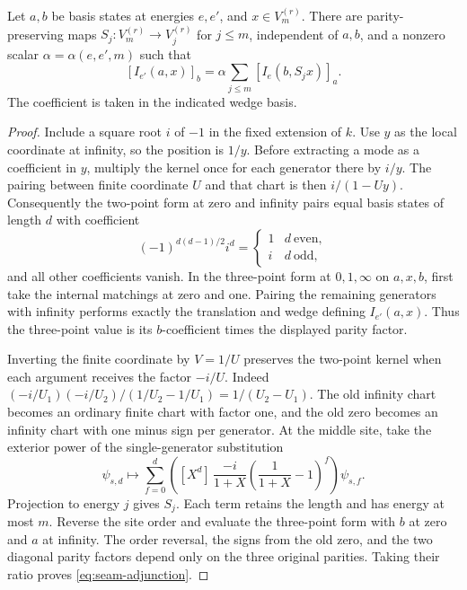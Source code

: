\begin{lemma}\label{lem:seam}
Let \(a,b\) be basis states at energies \(e,e'\), and
\(x\in V_m^{(r)}\). There are parity-preserving maps
\(S_j:V_m^{(r)}\to V_j^{(r)}\) for \(j\le m\), independent of \(a,b\),
and a nonzero scalar \(\alpha=\alpha(e,e',m)\) such that
\begin{equation}\label{eq:seam-adjunction}
 [I_{e'}(a,x)]_b
    =\alpha\sum_{j\le m}[I_e(b,S_jx)]_a .
\end{equation}
The coefficient is taken in the indicated wedge basis.
\end{lemma}
\begin{proof}
Include a square root \(i\) of \(-1\) in the fixed extension of \(k\).
Use \(y\) as the local coordinate at infinity, so the position is \(1/y\).
Before extracting a mode as a coefficient in \(y\), multiply the kernel
once for each generator there by
\(i/y\). The pairing between finite coordinate \(U\) and that chart is
then \(i/(1-Uy)\). Consequently the two-point form at zero and infinity
pairs equal basis states of length \(d\) with coefficient
\[
      (-1)^{d(d-1)/2}i^d=
      \begin{cases}1& d\ \text{even},\\ i& d\ \text{odd},\end{cases}
\]
and all other coefficients vanish. In the three-point form
at \(0,1,\infty\) on \(a,x,b\), first take the internal matchings at
zero and one. Pairing the remaining generators with infinity performs
exactly the translation and wedge defining \(I_{e'}(a,x)\). Thus the
three-point value is its \(b\)-coefficient times the displayed parity
factor.

Inverting the finite coordinate by \(V=1/U\) preserves the two-point
kernel when each argument receives the factor \(-i/U\). Indeed
\((-i/U_1)(-i/U_2)/(1/U_2-1/U_1)=1/(U_2-U_1)\).
The old infinity chart becomes an ordinary finite chart with factor one,
and the old zero becomes an infinity chart with one minus sign per
generator. At the middle site, take the exterior power of the
single-generator substitution
\[
 \psi_{s,d}\longmapsto
 \sum_{f=0}^{d}
 \left([X^d]\,\frac{-i}{1+X}
       \left(\frac{1}{1+X}-1\right)^{\!f}\right)\psi_{s,f}.
\]
Projection to energy \(j\) gives \(S_j\). Each term retains the length
and has energy at most \(m\). Reverse the site order and evaluate the
three-point form with \(b\) at zero and \(a\) at infinity. The order
reversal, the signs from the old zero, and the two diagonal parity factors
depend only on the three original parities. Taking their ratio proves
\eqref{eq:seam-adjunction}.
\end{proof}

